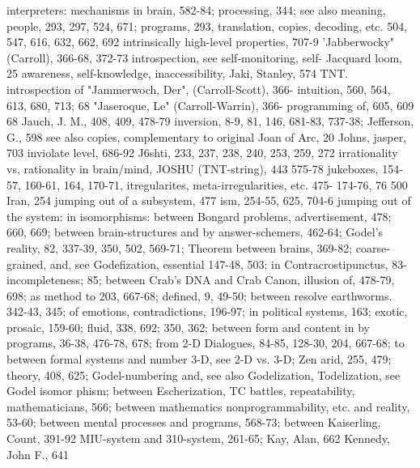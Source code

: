 interpreters: mechanisms in brain, 582-84;      processing, 344; see also meaning,
people, 293, 297, 524, 671; programs, 293,      translation, copies, decoding, etc.
504, 547, 616, 632, 662, 692
intrinsically high-level properties, 707-9      'Jabberwocky" (Carroll), 366-68, 372-73
introspection, see self-monitoring, self-       Jacquard loom, 25
awareness, self-knowledge, inaccessibility,     Jaki, Stanley, 574
TNT. introspection of                           "Jammerwoch, Der", (Carroll-Scott), 366-
intuition, 560, 564, 613, 680, 713;             68 "Jaseroque, Le" (Carroll-Warrin), 366-
programming of, 605, 609                        68 Jauch, J. M., 408, 409, 478-79
inversion, 8-9, 81, 146, 681-83, 737-38;        Jefferson, G., 598
see also copies, complementary to original      Joan of Arc, 20 Johns, jasper, 703
inviolate level, 686-92                         J6shti, 233, 237, 238, 240, 253, 259, 272
irrationality vs, rationality in brain/mind,    JOSHU (TNT-string), 443
575-78                                          jukeboxes, 154-57, 160-61, 164, 170-71,
itregularites, meta-irregularities, etc. 475-   174-76,
76                                              500
Iran, 254                                       jumping out of a subsystem, 477
ism, 254-55, 625, 704-6                         jumping out of the system: in
isomorphisms: between Bongard problems,         advertisement, 478;
660, 669; between brain-structures and          by answer-schemers, 462-64; Godel's
reality, 82, 337-39, 350, 502, 569-71;          Theorem
between brains, 369-82; coarse-grained,         and,     see     Godefization,       essential
147-48, 503; in Contracrostipunctus, 83-        incompleteness;
85; between Crab's DNA and Crab Canon,          illusion of, 478-79, 698; as method to
203, 667-68; defined, 9, 49-50; between         resolve
earthworms. 342-43, 345; of emotions,           contradictions, 196-97; in political systems,
163; exotic, prosaic, 159-60; fluid, 338,       692;
350, 362; between form and content in           by programs, 36-38, 476-78, 678; from 2-D
Dialogues, 84-85, 128-30, 204, 667-68;          to
between formal systems and number               3-D, see 2-D vs. 3-D; Zen arid, 255, 479;
theory, 408, 625; Godel-numbering and,          see also Godelization, Todelization,
see Godel isomor phism; between                 Escherization, TC battles, repeatability,
mathematicians, 566; between mathematics        nonprogrammability, etc.
and reality, 53-60; between mental
processes and programs, 568-73; between         Kaiserling, Count, 391-92
MIU-system and 310-system, 261-65;              Kay, Alan, 662 Kennedy, John F., 641

